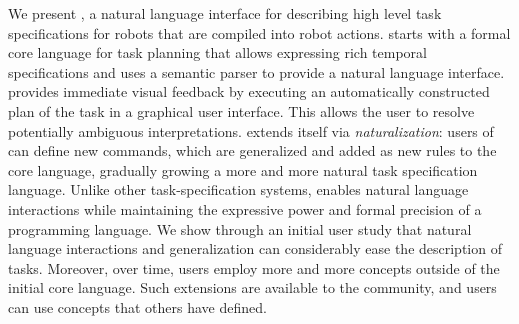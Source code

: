 We present \tool, a
natural language interface for describing
high level task specifications for robots
that are compiled into robot actions.
\tool starts with a formal core language for task planning that allows
expressing rich temporal specifications and
uses a semantic parser to provide a natural language interface.
\tool provides immediate visual feedback by executing an automatically
constructed plan of the task in a graphical user interface.
This allows the user to resolve potentially ambiguous interpretations.
\tool extends itself via \emph{naturalization}: users of \tool can
define new commands, which are generalized and added as new rules to the core language,
gradually growing a more and more natural task specification language.
%
Unlike other task-specification systems, \tool enables natural language
interactions while maintaining the expressive power and formal precision of a programming language.
We show through an initial user study that natural language interactions and generalization
can considerably ease the description of tasks.
Moreover, over time, users employ more and more concepts outside of the initial core language.
Such extensions are available to the \tool community, and users can use concepts that others have defined.
